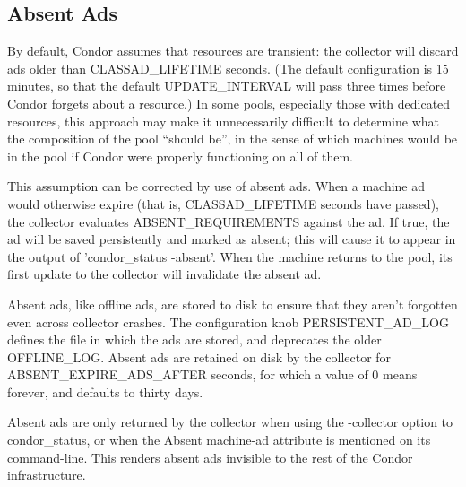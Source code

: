 \subsection{\label{sec:Absent-Ads}Absent Ads}

By default, Condor assumes that resources are transient: the collector 
will discard ads older than CLASSAD\_LIFETIME seconds.  (The default 
configuration is 15 minutes, so that the default UPDATE\_INTERVAL will 
pass three times before Condor forgets about a resource.)  In some 
pools, especially those with dedicated resources, this approach may make 
it unnecessarily difficult to determine what the composition of the pool 
``should be'', in the sense of which machines would be in the pool if 
Condor were properly functioning on all of them.

This assumption can be corrected by use of absent ads.  When a machine 
ad would otherwise expire (that is, CLASSAD\_LIFETIME seconds have 
passed), the collector evaluates ABSENT\_REQUIREMENTS against the ad.  If 
true, the ad will be saved persistently and marked as absent; this will 
cause it to appear in the output of 'condor\_status -absent'.  When the 
machine returns to the pool, its first update to the collector will 
invalidate the absent ad.

Absent ads, like offline ads, are stored to disk to ensure that they 
aren't forgotten even across collector crashes.  The configuration knob 
PERSISTENT\_AD\_LOG defines the file in which the ads are stored, and 
deprecates the older OFFLINE\_LOG.  Absent ads are retained on disk by 
the collector for ABSENT\_EXPIRE\_ADS\_AFTER seconds, for which a value of 
0 means forever, and defaults to thirty days.

Absent ads are only returned by the collector when using the -collector 
option to condor\_status, or when the Absent machine-ad attribute is 
mentioned on its command-line.  This renders absent ads invisible to the 
rest of the Condor infrastructure.

